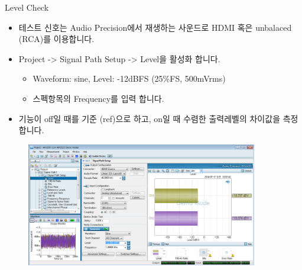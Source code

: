 \documentclass{beamer}
\begin{document}
	
	\begin{frame}[t]{Level Check}
		\begin{itemize}
			\item 테스트 신호는 Audio Precision에서 재생하는 사운드로 HDMI 혹은 unbalaced (RCA)를 이용합니다.
			\item Project -> Signal Path Setup -> Level을 활성화 합니다.
			\begin{itemize}
				\item Waveform: sine, Level: -12dBFS (25\%FS, 500mVrms)
				\item 스펙항목의 Frequency를 입력 합니다.
			\end{itemize}
			\item 기능이 off일 때를 기준 (ref)으로 하고, on일 때 수렴한 출력레벨의 차이값을 측정합니다.
		\end{itemize}
		
		\begin{figure}[b]
			\includegraphics[width=0.9\textwidth]{figure/apsetting/level.png}
		\end{figure}
		
	\end{frame}
	
\end{document}
